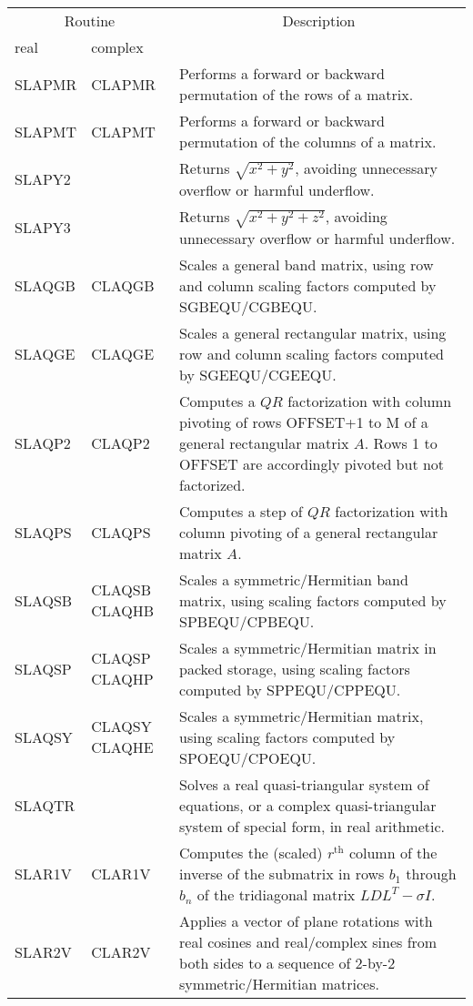 \begin{center}
\begin{tabular}{| l p{0.75in} |p{4.5in}    |}
\hline \multicolumn{2}{|c|}{Routine}&\multicolumn{1}{c|}{Description} \\ 
\cline{1-2} real&complex&\\
\hline \hline
SLAPMR&CLAPMR&
Performs a forward or backward permutation of the rows of a matrix. \\
SLAPMT&CLAPMT&
Performs a forward or backward permutation of the columns of a matrix. \\
SLAPY2&& 
Returns $ \sqrt{x^2 + y^2}$, 
avoiding unnecessary overflow or harmful underflow.\\
SLAPY3&& Returns $ \sqrt{x^2 + y^2 + z^2}$, 
avoiding unnecessary overflow or harmful underflow.\\
SLAQGB&CLAQGB& 
Scales a general band matrix,
using row and column scaling factors computed by SGBEQU/CGBEQU.\\
SLAQGE&CLAQGE& 
Scales a general rectangular matrix, 
using row and column scaling factors computed by SGEEQU/CGEEQU.\\
SLAQP2&CLAQP2&
Computes a $QR$ factorization with column pivoting of rows 
OFFSET+1 to M 
of a general rectangular matrix $A$. Rows 1 to 
OFFSET are accordingly pivoted
but not factorized.\\
SLAQPS&CLAQPS&
Computes a step of $QR$ factorization with column pivoting
of a general rectangular matrix $A$. \\
SLAQSB&CLAQSB CLAQHB& 
Scales a symmetric/Hermitian band matrix,
using scaling factors computed by SPBEQU/CPBEQU.\\
SLAQSP&CLAQSP CLAQHP& 
Scales a symmetric/Hermitian matrix in packed storage,
using scaling factors computed by SPPEQU/CPPEQU.\\
SLAQSY&CLAQSY CLAQHE& 
Scales a symmetric/Hermitian matrix,
using scaling factors computed by SPOEQU/CPOEQU.\\
SLAQTR&&
Solves a real quasi-triangular system of equations,
or a complex quasi-triangular system of special form,
in real arithmetic.\\
SLAR1V&CLAR1V&
Computes the (scaled) $r^{\mbox{th}}$ column of the inverse of
the submatrix in rows $b_{1}$ through $b_{n}$ of the tridiagonal matrix
$L D L^T - \sigma I$. \\
SLAR2V&CLAR2V& 
Applies a vector of plane rotations with real cosines and real/complex sines
from both sides to a sequence of 2-by-2 symmetric/Hermitian matrices.\\

\end{tabular}
\end{center}
